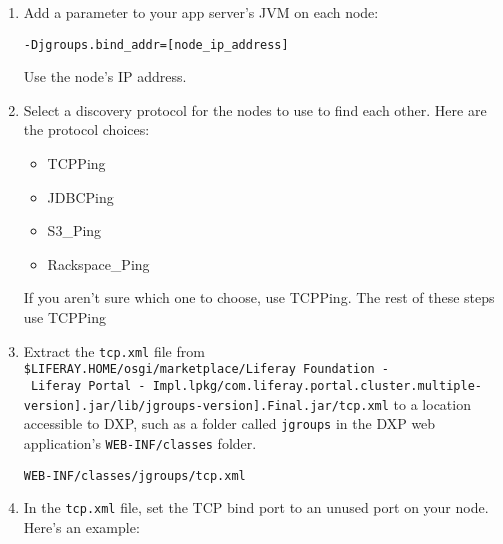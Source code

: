 \begin{enumerate}
\def\labelenumi{\arabic{enumi}.}
\item
  Add a parameter to your app server's JVM on each node:

\begin{verbatim}
-Djgroups.bind_addr=[node_ip_address]
\end{verbatim}

  Use the node's IP address.
\item
  Select a discovery protocol for the nodes to use to find each other.
  Here are the protocol choices:

  \begin{itemize}
  \tightlist
  \item
    TCPPing
  \item
    JDBCPing
  \item
    S3\_Ping
  \item
    Rackspace\_Ping
  \end{itemize}

  If you aren't sure which one to choose, use TCPPing. The rest of these
  steps use TCPPing
\item
  Extract the \texttt{tcp.xml} file from
  \texttt{\$LIFERAY.HOME/osgi/marketplace/Liferay\ Foundation\ -\ Liferay\ Portal\ -\ Impl.lpkg/com\hspace{0pt}.\hspace{0pt}liferay\hspace{0pt}.\hspace{0pt}portal\hspace{0pt}.\hspace{0pt}cluster\hspace{0pt}.\hspace{0pt}multiple\hspace{0pt}-\hspace{0pt}{[}version{]}.\hspace{0pt}jar/lib\hspace{0pt}/\hspace{0pt}jgroups\hspace{0pt}-\hspace{0pt}{[}version{]}.\hspace{0pt}Final\hspace{0pt}.\hspace{0pt}jar/tcp.xml}
  to a location accessible to DXP, such as a folder called
  \texttt{jgroups} in the DXP web application's \texttt{WEB-INF/classes}
  folder.

\begin{verbatim}
WEB-INF/classes/jgroups/tcp.xml
\end{verbatim}
\item
  In the \texttt{tcp.xml} file, set the TCP bind port to an unused port
  on your node. Here's an example:


\end{enumerate}
